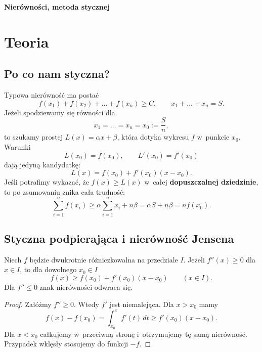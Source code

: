 \documentclass{lecture-kuznia}
\def\title{Nierówności, metoda stycznej}
\begin{document}
\begin{center}
	{\LARGE\textbf{\title{}}}
\end{center}

\section{Teoria}

\subsection{Po co nam styczna?}

Typowa nierówność ma postać
\[
	f(x_1)+f(x_2)+\dots+f(x_n)\geqslant C,
	\qquad x_1+\dots+x_n=S.
\]
Jeżeli spodziewamy się równości dla
\[
	x_1=\dots=x_n=x_0:=\frac Sn,
\]
to szukamy prostej $L(x)=\alpha x+\beta$, która dotyka wykresu $f$ w~punkcie
$x_0$. Warunki
\[
	L(x_0)=f(x_0),\qquad L'(x_0)=f'(x_0)
\]
dają jedyną kandydatkę:
\[
	L(x)=f(x_0)+f'(x_0)(x-x_0).
\]
Jeśli potrafimy wykazać, że $f(x)\geqslant L(x)$ w~całej \textbf{dopuszczalnej
dziedzinie}, to po zsumowaniu znika cała trudność:
\[
	\sum_{i=1}^n f(x_i)
	\geqslant
	\alpha\sum_{i=1}^n x_i+n\beta
	=\alpha S+n\beta=nf(x_0).
\]

\subsection{Styczna podpierająca i nierówność Jensena}

\begin{theorem}
	Niech $f$ będzie dwukrotnie różniczkowalna na przedziale $I$.
	Jeżeli $f''(x)\geqslant0$ dla $x\in I$, to dla dowolnego $x_0\in I$
	\[
		f(x)\geqslant f(x_0)+f'(x_0)(x-x_0)
		\qquad (x\in I).
	\]
	Dla $f''\leqslant0$ znak nierówności odwraca się.
\end{theorem}
\begin{proof}
	Załóżmy $f''\geqslant0$. Wtedy $f'$ jest niemalejąca. Dla $x>x_0$ mamy
	\[
		f(x)-f(x_0)=\int_{x_0}^{x}f'(t)\,dt
		\geqslant f'(x_0)(x-x_0).
	\]
	Dla $x<x_0$ całkujemy w~przeciwną stronę i~otrzymujemy tę samą nierówność.
	Przypadek wklęsły stosujemy do funkcji $-f$.
\end{proof}
\end{document}
